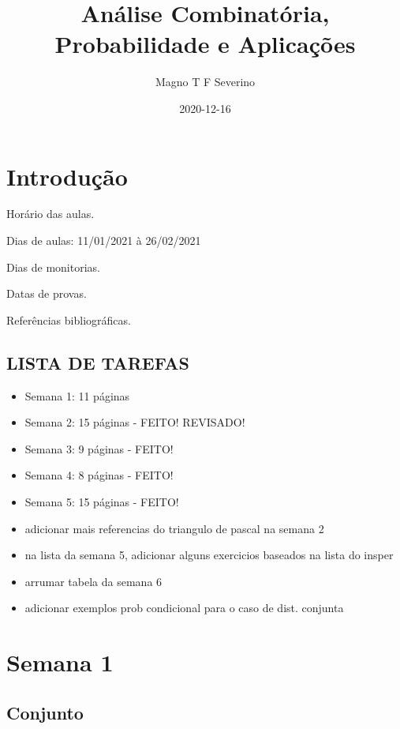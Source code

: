 \documentclass[]{book}
\title{Análise Combinatória, Probabilidade e Aplicações}
\author{Magno T F Severino}
\date{2020-12-16}
\theoremstyle{definition}
\theoremstyle{definition}
\theoremstyle{definition}
\theoremstyle{remark}
\begin{document}
\maketitle

{
\setcounter{tocdepth}{1}
\tableofcontents
}
\hypertarget{introduuxe7uxe3o}{%
\chapter*{Introdução}\label{introduuxe7uxe3o}}

Horário das aulas.

Dias de aulas: 11/01/2021 à 26/02/2021

Dias de monitorias.

Datas de provas.

Referências bibliográficas.

\hypertarget{lista-de-tarefas}{%
\section*{LISTA DE TAREFAS}\label{lista-de-tarefas}}

\begin{itemize}
\item
  Semana 1: 11 páginas
\item
  Semana 2: 15 páginas - FEITO! REVISADO!
\item
  Semana 3: 9 páginas - FEITO!
\item
  Semana 4: 8 páginas - FEITO!
\item
  Semana 5: 15 páginas - FEITO!
\item
  adicionar mais referencias do triangulo de pascal na semana 2
\item
  na lista da semana 5, adicionar alguns exercicios baseados na lista do insper
\item
  arrumar tabela da semana 6
\item
  adicionar exemplos prob condicional para o caso de dist. conjunta
\end{itemize}

\hypertarget{sem1}{%
\chapter{Semana 1}\label{sem1}}

\hypertarget{conjunto}{%
\section{Conjunto}\label{conjunto}}
\end{document}
